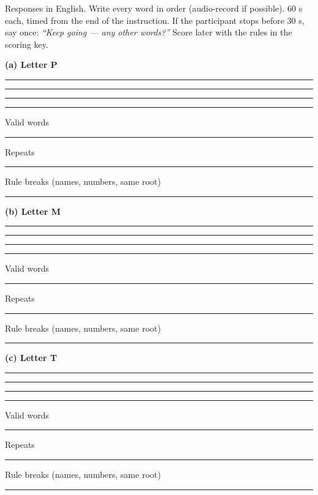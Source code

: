 \documentclass[10pt,a4paper]{article}
\newcommand{\blank}[1][1.2cm]{\rule{#1}{0.4pt}}
\begin{document}
Responses in English. Write every word in order (audio-record if possible). 60 s each, timed from the end of the instruction. If the participant stops before 30 s, say once: \textit{``Keep going --- any other words?''} Score later with the rules in the scoring key.
\par{}\medskip\textbf{(a) Letter P}\par\vspace{2pt}\blank[\linewidth]\par\vspace{9pt}\blank[\linewidth]\par\vspace{9pt}\blank[\linewidth]\par\vspace{9pt}\blank[\linewidth]\par\vspace{9pt}
Valid words \blank\quad Repeats \blank\quad Rule breaks (names, numbers, same root) \blank\par
\par{}\medskip\textbf{(b) Letter M}\par\vspace{2pt}\blank[\linewidth]\par\vspace{9pt}\blank[\linewidth]\par\vspace{9pt}\blank[\linewidth]\par\vspace{9pt}\blank[\linewidth]\par\vspace{9pt}
Valid words \blank\quad Repeats \blank\quad Rule breaks (names, numbers, same root) \blank\par
\par{}\medskip\textbf{(c) Letter T}\par\vspace{2pt}\blank[\linewidth]\par\vspace{9pt}\blank[\linewidth]\par\vspace{9pt}\blank[\linewidth]\par\vspace{9pt}\blank[\linewidth]\par\vspace{9pt}
Valid words \blank\quad Repeats \blank\quad Rule breaks (names, numbers, same root) \blank\par
\end{document}
